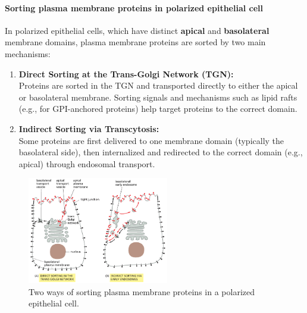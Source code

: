 \documentclass[../main.tex]{subfiles}
\begin{document}
\paragraph{Sorting plasma membrane proteins in polarized epithelial cell}
In polarized epithelial cells, which have distinct \textbf{apical} and \textbf{basolateral} membrane domains, plasma membrane proteins are sorted by two main mechanisms:

\begin{enumerate}
	\item \textbf{Direct Sorting at the Trans-Golgi Network (TGN):} \\
	Proteins are sorted in the TGN and transported directly to either the apical or basolateral membrane. Sorting signals and mechanisms such as lipid rafts (e.g., for GPI-anchored proteins) help target proteins to the correct domain.
	
	\item \textbf{Indirect Sorting via Transcytosis:} \\
	Some proteins are first delivered to one membrane domain (typically the basolateral side), then internalized and redirected to the correct domain (e.g., apical) through endosomal transport.
\end{enumerate}

\begin{figure}[H]
	\centering
	\includegraphics[width= 0.55\textwidth]{49}
	\caption{Two ways of sorting plasma membrane proteins in a polarized epithelial cell.}
\end{figure}

\printglossaries	
\end{document}
